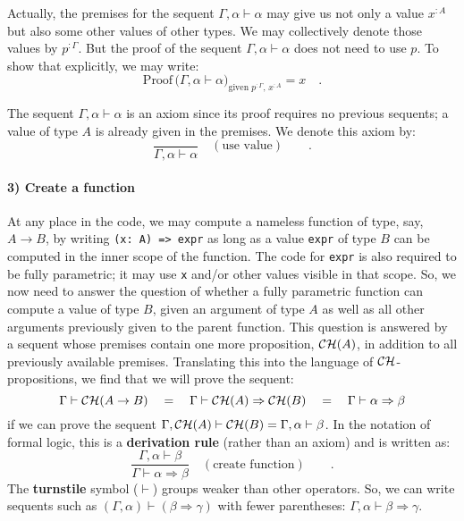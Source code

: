 Actually, the premises for the sequent $\Gamma,\alpha\vdash\alpha$
may give us not only a value $x^{:A}$ but also some other values
of other types. We may collectively denote those values by $p^{:\Gamma}$.
But the proof of the sequent $\Gamma,\alpha\vdash\alpha$ does not
need to use $p$. To show that explicitly, we may write:
\[
\text{Proof}\,\big(\Gamma,\alpha\vdash\alpha\big)_{\text{given }p^{:\Gamma},\,x^{:A}}=x\quad.
\]

The sequent $\Gamma,\alpha\vdash\alpha$ is an axiom since its proof
requires no previous sequents; a value of type $A$ is already given
in the premises. We denote this axiom by:
\[
\frac{~}{\Gamma,\alpha\vdash\alpha}\quad(\text{use value})\quad\quad.
\]


\paragraph{3) Create a function}

At any place in the code, we may compute a nameless function of type,
say, $A\rightarrow B$, by writing \lstinline!(x: A) => expr! as
long as a value \lstinline!expr! of type $B$ can be computed in
the inner scope of the function. The code for \lstinline!expr! is
also required to be fully parametric; it may use \lstinline!x! and/or
other values visible in that scope. So, we now need to answer the
question of whether a fully parametric function can compute a value
of type $B$, given an argument of type $A$ as well as all other
arguments previously given to the parent function. This question is
answered by a sequent whose premises contain one more proposition,
${\cal CH}(A)$, in addition to all previously available premises.
Translating this into the language of ${\cal CH}$-propositions, we
find that we will prove the sequent:
\[
\Gamma\vdash{\cal CH}(A\rightarrow B)\quad=\quad\Gamma\vdash{\cal CH}(A)\Rightarrow{\cal CH}(B)\quad=\quad\Gamma\vdash\alpha\Rightarrow\beta
\]
if we can prove the sequent $\Gamma,{\cal CH}(A)\vdash{\cal CH}(B)=\Gamma,\alpha\vdash\beta$.
In the notation of formal logic, this is a \textbf{derivation rule}
(rather than an axiom) and is written as:
\[
\frac{\Gamma,\alpha\vdash\beta}{\Gamma\vdash\alpha\Rightarrow\beta}\quad(\text{create function})\quad\quad.
\]
The \textbf{turnstile}
symbol ($\vdash$) groups weaker than other operators. So, we can
write sequents such as $(\Gamma,\alpha)\vdash(\beta\Rightarrow\gamma)$
with fewer parentheses: $\Gamma,\alpha\vdash\beta\Rightarrow\gamma$.

